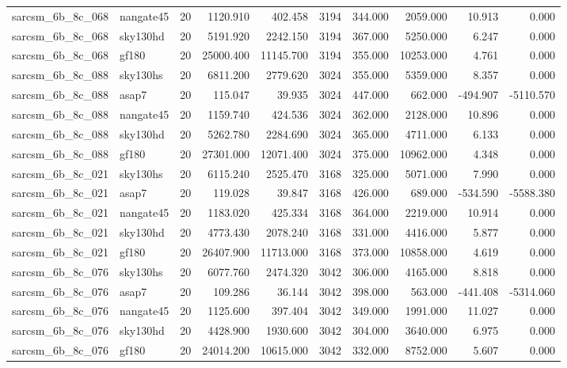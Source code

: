 \begin{longtable}{llrrrrrrrr}
sarcsm\_6b\_8c\_068 & nangate45 & 20 & 1120.910 & 402.458 & 3194 & 344.000 & 2059.000 & 10.913 & 0.000 \\
sarcsm\_6b\_8c\_068 & sky130hd & 20 & 5191.920 & 2242.150 & 3194 & 367.000 & 5250.000 & 6.247 & 0.000 \\
sarcsm\_6b\_8c\_068 & gf180 & 20 & 25000.400 & 11145.700 & 3194 & 355.000 & 10253.000 & 4.761 & 0.000 \\
sarcsm\_6b\_8c\_088 & sky130hs & 20 & 6811.200 & 2779.620 & 3024 & 355.000 & 5359.000 & 8.357 & 0.000 \\
sarcsm\_6b\_8c\_088 & asap7 & 20 & 115.047 & 39.935 & 3024 & 447.000 & 662.000 & -494.907 & -5110.570 \\
sarcsm\_6b\_8c\_088 & nangate45 & 20 & 1159.740 & 424.536 & 3024 & 362.000 & 2128.000 & 10.896 & 0.000 \\
sarcsm\_6b\_8c\_088 & sky130hd & 20 & 5262.780 & 2284.690 & 3024 & 365.000 & 4711.000 & 6.133 & 0.000 \\
sarcsm\_6b\_8c\_088 & gf180 & 20 & 27301.000 & 12071.400 & 3024 & 375.000 & 10962.000 & 4.348 & 0.000 \\
sarcsm\_6b\_8c\_021 & sky130hs & 20 & 6115.240 & 2525.470 & 3168 & 325.000 & 5071.000 & 7.990 & 0.000 \\
sarcsm\_6b\_8c\_021 & asap7 & 20 & 119.028 & 39.847 & 3168 & 426.000 & 689.000 & -534.590 & -5588.380 \\
sarcsm\_6b\_8c\_021 & nangate45 & 20 & 1183.020 & 425.334 & 3168 & 364.000 & 2219.000 & 10.914 & 0.000 \\
sarcsm\_6b\_8c\_021 & sky130hd & 20 & 4773.430 & 2078.240 & 3168 & 331.000 & 4416.000 & 5.877 & 0.000 \\
sarcsm\_6b\_8c\_021 & gf180 & 20 & 26407.900 & 11713.000 & 3168 & 373.000 & 10858.000 & 4.619 & 0.000 \\
sarcsm\_6b\_8c\_076 & sky130hs & 20 & 6077.760 & 2474.320 & 3042 & 306.000 & 4165.000 & 8.818 & 0.000 \\
sarcsm\_6b\_8c\_076 & asap7 & 20 & 109.286 & 36.144 & 3042 & 398.000 & 563.000 & -441.408 & -5314.060 \\
sarcsm\_6b\_8c\_076 & nangate45 & 20 & 1125.600 & 397.404 & 3042 & 349.000 & 1991.000 & 11.027 & 0.000 \\
sarcsm\_6b\_8c\_076 & sky130hd & 20 & 4428.900 & 1930.600 & 3042 & 304.000 & 3640.000 & 6.975 & 0.000 \\
sarcsm\_6b\_8c\_076 & gf180 & 20 & 24014.200 & 10615.000 & 3042 & 332.000 & 8752.000 & 5.607 & 0.000 \\

\end{longtable}
